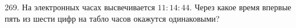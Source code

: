 269. На электронных часах высвечивается $11:14:44.$ Через какое время впервые пять из шести цифр на табло часов окажутся одинаковыми?\\
